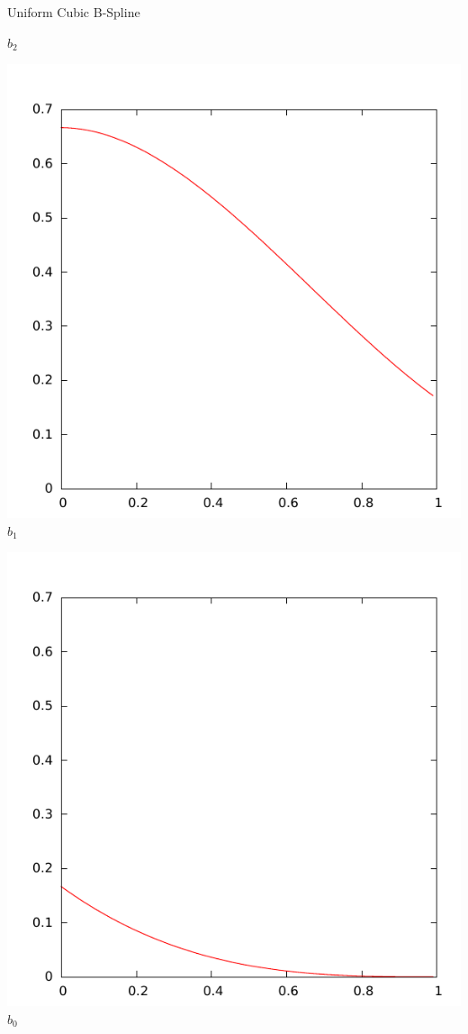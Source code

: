\documentclass{beamer}
\begin{document}
\begin{frame}{Uniform Cubic B-Spline}
\begin{minipage}{0.25\columnwidth}
    $b_2$
  \end{minipage}%
  \begin{minipage}{0.25\columnwidth}
    \centering
    \includegraphics[width=\columnwidth]{b1.pdf}\\
    $b_1$
  \end{minipage}%
  \begin{minipage}{0.25\columnwidth}
    \centering
    \includegraphics[width=\columnwidth]{b0.pdf}\\
    $b_0$
  \end{minipage}
  
\end{frame}
\end{document}
